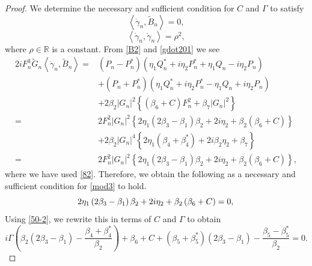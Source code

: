 \documentclass[10pt,leqno]{amsart}
\numberwithin{equation}{section}
\begin{document}
\begin{proof}
    We determine the necessary and sufficient condition for $C$ and $\Gamma$ to satisfy
\begin{equation}\label{mod3}
\left\langle\dot{\gamma}_{n}, \widetilde{B}_{n}\right\rangle=0,
\end{equation}
\begin{equation}\label{mod2}
\left\langle\dot{\gamma}_{n}, \dot{\gamma}_{n}\right\rangle=\rho^{2},
\end{equation}
where $\rho\in\mathbb{R}$ is a constant.
From \eqref{B2} and \eqref{gdot201} we see
\begin{equation}\label{bgdot2}
\begin{split}
2iF_{n}^{3}\widetilde{G}_{n}\left\langle\dot{\gamma}_{n}, \widetilde{B}_{n}\right\rangle=&\left(P_{n}-P_{n}^{*}\right)\left(\eta_{1}Q_{n}^{*}+i\eta_{2}P_{n}^{*}+\eta_{1}Q_{n}-i\eta_{2}P_{n}\right)\\
&+\left(P_{n}+P_{n}^{*}\right)\left(\eta_{1}Q_{n}^{*}+i\eta_{2}P_{n}^{*}-\eta_{1}Q_{n}+i\eta_{2}P_{n}\right)\\
&+2\beta_{2} |G_{n}|^{2}\left\{\left(\beta_{6}+C\right)F_{n}^{2}+\beta_{7}|G_{n}|^{2}\right\}\\
=&2F_{n}^{2}|G_{n}|^{2}\left\{2\eta_{1}\left(2\beta_{3}-\beta_{1}\right)\beta_{2}+2i\eta_{2}+\beta_{2}\left(\beta_{6}+C\right)\right\}\\
&+2\beta_{2}|G_{n}|^{4}\left\{2\eta_{1}\left(\beta_{4}+\beta_{4}^{*}\right)+2i\beta_{2}\eta_{2}+\beta_{7}\right\}\\
=&2F_{n}^{2}|G_{n}|^{2}\left\{2\eta_{1}\left(2\beta_{3}-\beta_{1}\right)\beta_{2}+2i\eta_{2}+\beta_{2}\left(\beta_{6}+C\right)\right\},
\end{split}
\end{equation}
where we have used \eqref{82}.
Therefore, we obtain the following as a necessary and sufficient condition for \eqref{mod3} to hold.
\begin{equation}\label{con1}
2\eta_{1}\left(2\beta_{3}-\beta_{1}\right)\beta_{2}+2i\eta_{2}+\beta_{2}\left(\beta_{6}+C\right)=0,\\
\end{equation}
Using \eqref{50-2}, we rewrite this in terms of $C$ and $\Gamma$ to obtain
\begin{equation}\label{con11}
i\Gamma\left(\beta_{2}\left(2\beta_{3}-\beta_{1}\right)-\frac{\beta_{4}+\beta_{4}^{*}}{\beta_{2}}\right)+\beta_{6}+C+\left(\beta_{5}+\beta_{5}^{*}\right)\left(2\beta_{3}-\beta_{1}\right)-\frac{\beta_{5}-\beta_{5}^{*}}{\beta_{2}}=0.

\end{equation}
\end{proof}
\end{document}
